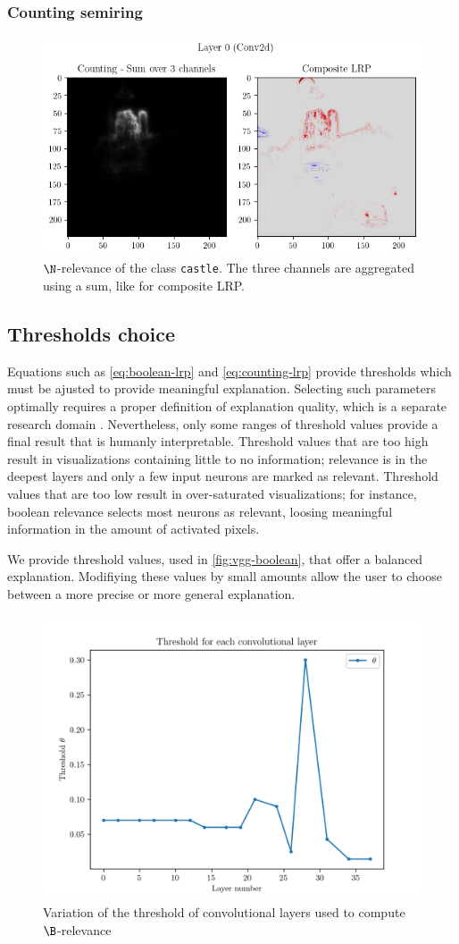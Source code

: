 \documentclass{../cs-classes/cs-classes}
\newcommand*{\1}{\digitsbb{1}}
\newcommand*{\0}{\digitsbb{0}}
\begin{document}
\subsubsection{Counting semiring}
\begin{figure}[H]
    \centering
    \includegraphics[width=.65\textwidth]{vgg-counting.png}
    \caption{$\N$-relevance of the class \texttt{castle}. The three channels are aggregated\\ using a sum, like for composite LRP.}
\end{figure}

\subsection{Thresholds choice}
\label{seq:thresholds-choice}
Equations such as \ref{eq:boolean-lrp} and \ref{eq:counting-lrp} provide thresholds which must be ajusted to provide meaningful explanation. Selecting such parameters optimally requires a proper definition of explanation quality, which is a separate research domain \cite{samek2016evaluating}. Nevertheless, only some ranges of threshold values provide a final result that is humanly interpretable. Threshold values that are too high result in visualizations containing little to no information; relevance is  in the deepest layers and only a few input neurons are marked as relevant. Threshold values that are too low result in over-saturated visualizations; for instance, boolean relevance selects most neurons as relevant, loosing meaningful information in the amount of activated pixels.

We provide threshold values, used in \autoref{fig:vgg-boolean}, that offer a balanced explanation. Modifiying these values by small amounts allow the user to choose between a more precise or more general explanation.
\begin{figure}[H]
    \centering
    \includegraphics[width=.65\textwidth]{threshold-graph.png}
    \caption{Variation of the threshold of convolutional layers used to compute $\B$-relevance}
\end{figure}
\end{document}
